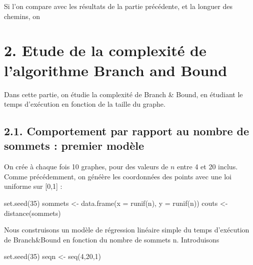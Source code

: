 \documentclass[
]{article}
\newenvironment{Shaded}{\begin{snugshade}}{\end{snugshade}}
\newcommand{\AttributeTok}[1]{\textcolor[rgb]{0.77,0.63,0.00}{#1}}
\newcommand{\DecValTok}[1]{\textcolor[rgb]{0.00,0.00,0.81}{#1}}
\newcommand{\FunctionTok}[1]{\textcolor[rgb]{0.00,0.00,0.00}{#1}}
\newcommand{\NormalTok}[1]{#1}
\newcommand{\OtherTok}[1]{\textcolor[rgb]{0.56,0.35,0.01}{#1}}
\begin{document}
Si l'on compare avec les résultats de la partie précédente, et la
longuer des chemins, on

\hypertarget{etude-de-la-complexituxe9-de-lalgorithme-branch-and-bound}{%
\section{2. Etude de la complexité de l'algorithme Branch and
Bound}\label{etude-de-la-complexituxe9-de-lalgorithme-branch-and-bound}}

Dans cette partie, on étudie la complexité de Branch \& Bound, en
étudiant le temps d'exécution en fonction de la taille du graphe.

\hypertarget{comportement-par-rapport-au-nombre-de-sommets-premier-moduxe8le}{%
\subsection{2.1. Comportement par rapport au nombre de sommets : premier
modèle}\label{comportement-par-rapport-au-nombre-de-sommets-premier-moduxe8le}}

On crée à chaque fois 10 graphes, pour des valeurs de \(n\) entre 4 et
20 inclus. Comme précédemment, on généère les coordonnées des points
avec une loi uniforme sur {[}0,1{]} :

\begin{Shaded}
\begin{Highlighting}[]
\FunctionTok{set.seed}\NormalTok{(}\DecValTok{35}\NormalTok{)}
\NormalTok{sommets }\OtherTok{\textless{}{-}} \FunctionTok{data.frame}\NormalTok{(}\AttributeTok{x =} \FunctionTok{runif}\NormalTok{(n), }\AttributeTok{y =} \FunctionTok{runif}\NormalTok{(n))}
\NormalTok{couts }\OtherTok{\textless{}{-}} \FunctionTok{distance}\NormalTok{(sommets)}
\end{Highlighting}
\end{Shaded}

Nous construisons un modèle de régression linéaire simple du temps
d'exécution de Branch\&Bound en fonction du nombre de sommets n.
Introduisons

\begin{Shaded}
\begin{Highlighting}[]
\FunctionTok{set.seed}\NormalTok{(}\DecValTok{35}\NormalTok{)}
\NormalTok{seqn }\OtherTok{\textless{}{-}} \FunctionTok{seq}\NormalTok{(}\DecValTok{4}\NormalTok{,}\DecValTok{20}\NormalTok{,}\DecValTok{1}\NormalTok{)}
\end{Highlighting}
\end{Shaded}
\end{document}

